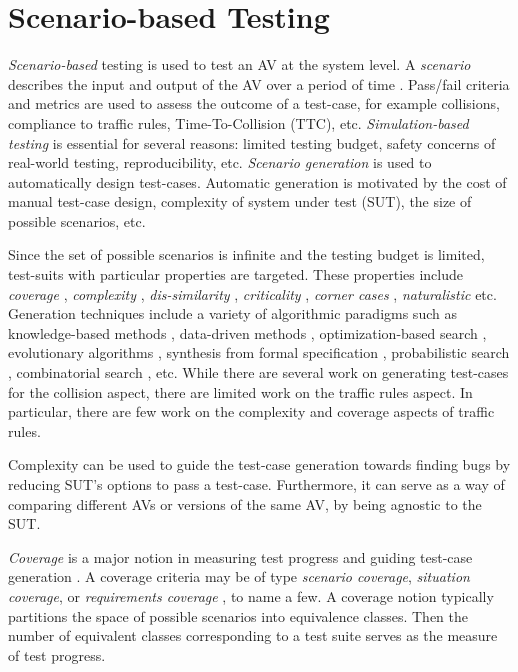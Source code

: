 \section{Scenario-based Testing}

\emph{Scenario-based} testing \cite{Riedmaier.2020} is used to test an AV at the system level.
%
A \emph{scenario} describes the input and output of the AV over a period of time \cite{Ulbrich.2015}.
%
Pass/fail criteria and metrics are used to assess the outcome of a test-case, for example collisions,  compliance to traffic rules, Time-To-Collision (TTC), etc.
%
\emph{Simulation-based testing} \cite{Abdessalem.2018:feature,Abdessalem.2018:vision,Abeysirigoonawardena.2019,Abdessalem.2016,Ding.2020,Gambi.2019,Norden.2019} is essential for several reasons: limited testing budget, safety concerns of real-world testing, reproducibility, etc.
%
\emph{Scenario generation} is used to automatically design test-cases.
%
Automatic generation is motivated by the cost of manual test-case design, complexity of system under test (SUT), the size of possible scenarios, etc.


Since the set of possible scenarios is infinite and the testing budget is limited, test-suits with particular properties are targeted.
%
These properties include \emph{coverage} \cite{Sheikhi.2022}, \emph{complexity} \cite{Gao.2019,Xia.2017,Xia.2018,Wang.2018},
 \emph{dis-similarity} \cite{Harder.2021}, \emph{criticality} \cite{Klischat.2019,Zhong.2021}, \emph{corner cases} \cite{OKelly.2018}, \emph{naturalistic} \cite{Akagi.2019}
 etc.
%
Generation techniques include a variety of algorithmic paradigms such as  knowledge-based methods \cite{Li.2020}, data-driven methods \cite{OKelly.2018}, optimization-based search \cite{Klischat.2020,Feng_Methodology.2020,Feng_CaseStudies.2020}, evolutionary algorithms \cite{Klischat.2019,Calo.2020,Zhong.2021,Sheikhi.2022}, synthesis from formal specification \cite{Klischat.2020,Tuncali.2019}, probabilistic search \cite{Fremont_testing.2020,Tuncali.2016}, combinatorial search \cite{Tuncali.2019,Gao.2019,Xia.2018}, etc.
%
While there are several work on generating test-cases for the collision aspect, there are limited work on the traffic rules aspect.
%
In particular, there are few work on the complexity and coverage aspects of traffic rules.


Complexity can be used to guide the test-case generation towards finding bugs by reducing SUT's options to pass a test-case.
%
Furthermore, it can serve as a way of comparing different AVs or versions of the same AV, by being agnostic to the SUT.


\emph{Coverage}
is a major notion in measuring test progress and guiding test-case generation \cite{Tahir.2020,Tahir.2022,Xia.2018,Hawkins.2019,Majzik.2019,Tang.2021}.
%
A coverage criteria may be of type \emph{scenario coverage}, \emph{situation coverage}, or \emph{requirements coverage} \cite{Tahir.2020}, to name a few.
%
A coverage notion typically partitions the space of possible scenarios into equivalence classes.
%
Then the number of equivalent classes corresponding to a test suite serves as the measure of test progress.
